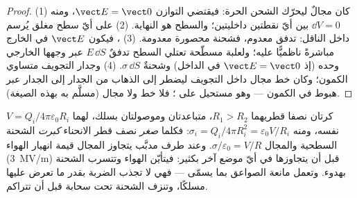 \begin{proof}
(1) كان مجالٌ ليحرّك الشحن الحرة: فيقتضي التوازن $\vect E =
\vect 0$، ومنه $\dd V = 0$ بين أيّ نقطتين داخليتين؛ والسطح
هو النهاية. (2)  على أيّ سطح مغلق يُرسم داخل
الناقل: تدفق معدوم، فشحنة محصورة معدومة. (3) ، فيكون $\vect E$ في الخارج مباشرةً ناظميًّا عليه؛ ولعلبة مسطّحة
تعتلي السطح تدفقٌ $E\,\dd S$ عبر وجهها الخارجي وحده
(إذ $\vect E = \vect 0$ في الداخل) وشحنةٌ $\sigma\,\dd S$. (4) وجدار التجويف
متساوي الكمون؛ وكان خط مجال داخل التجويف ليضطر إلى
الذهاب من الجدار إلى الجدار عبر هبوط في الكمون --- وهو مستحيل على
؛ فلا خط ولا مجال (مسلَّم به بهذه الصيغة).
\end{proof}

\begin{example}\label{ex:b1:potential-capacitors:point}
كرتان نصفا قطريهما $R_1 > R_2$، متباعدتان وموصولتان بسلك، لهما
$V = Q_i/4\pi\varepsilon_0R_i$ نفسه، ومنه $\sigma_i = Q_i/4\pi R_i^2 = \varepsilon_0V/R_i$:
فكلما \emph{صغر} نصف قطر الانحناء \emph{كبرت} الشحنة
السطحية والمجال $\sigma/\varepsilon_0 = V/R$. وعند طرف مدبَّب يتجاوز المجال
قيمة انهيار الهواء (\qty{3}{MV/m}) قبل أن يتجاوزها في
أيّ موضع آخر بكثير: فيتأيّن الهواء وتتسرب الشحنة بهدوء. وتعمل
مانعة الصواعق بما يسمّى \emph{} --- فهي لا تجذب
الضربة بقدر ما تعرض عليها مسلكًا، وتنزف الشحنة تحت
سحابة قبل أن تتراكم.
\end{example}

